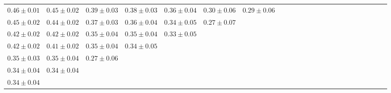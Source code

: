\begin{table}[ht]
{{\begin{adjustbox}{width=\textwidth}
\begin{tabular}{ccccccccccccccccccccccc}
$0.46 \pm 0.01$ & $0.45 \pm 0.02$ & $0.39 \pm 0.03$ & $0.38 \pm 0.03$ & $0.36 \pm 0.04$ & $0.30 \pm 0.06$ & $0.29 \pm 0.06$ &  &  &  &  &  &  &  &  &  &  &  &  &  &  &  &  \\
$0.45 \pm 0.02$ & $0.44 \pm 0.02$ & $0.37 \pm 0.03$ & $0.36 \pm 0.04$ & $0.34 \pm 0.05$ & $0.27 \pm 0.07$ &  &  &  &  &  &  &  &  &  &  &  &  &  &  &  &  &  \\
$0.42 \pm 0.02$ & $0.42 \pm 0.02$ & $0.35 \pm 0.04$ & $0.35 \pm 0.04$ & $0.33 \pm 0.05$ &  &  &  &  &  &  &  &  &  &  &  &  &  &  &  &  &  &  \\
$0.42 \pm 0.02$ & $0.41 \pm 0.02$ & $0.35 \pm 0.04$ & $0.34 \pm 0.05$ &  &  &  &  &  &  &  &  &  &  &  &  &  &  &  &  &  &  &  \\
$0.35 \pm 0.03$ & $0.35 \pm 0.04$ & $0.27 \pm 0.06$ &  &  &  &  &  &  &  &  &  &  &  &  &  &  &  &  &  &  &  &  \\
$0.34 \pm 0.04$ & $0.34 \pm 0.04$ &  &  &  &  &  &  &  &  &  &  &  &  &  &  &  &  &  &  &  &  &  \\
$0.34 \pm 0.04$ &  &  &  &  &  &  &  &  &  &  &  &  &  &  &  &  &  &  &  &  &  &  \\
 
\end{tabular}
\end{adjustbox}
}
}

\end{table}
